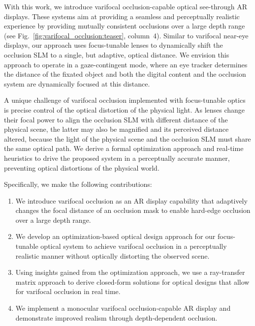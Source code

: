 With this work, we introduce varifocal occlusion-capable optical see-through AR displays. These systems aim at providing a seamless and perceptually realistic experience by providing mutually consistent occlusions over a large depth range (see Fig.~\ref{fig:varifocal_occlusion:teaser}, column~4). Similar to varifocal near-eye displays, our approach uses focus-tunable lenses to dynamically shift the occlusion SLM to a single, but adaptive, optical distance. We envision this approach to operate in a gaze-contingent mode, where an eye tracker determines the distance of the fixated object and both the digital content and the occlusion system are dynamically focused at this distance. 

A unique challenge of varifocal occlusion implemented with focus-tunable optics is precise control of the optical distortion of the physical light. As lenses change their focal power to align the occlusion SLM with different distance of the physical scene, the latter may also be magnified and its perceived distance altered, because the light of the physical scene and the occlusion SLM must share the same optical path. We derive a formal optimization approach and real-time heuristics to drive the proposed system in a perceptually accurate manner, preventing optical distortions of the physical world. 

Specifically, we make the following contributions:
%
\begin{enumerate}
\item We introduce varifocal occlusion as an AR display capability that adaptively changes the focal distance of an occlusion mask to enable hard-edge occlusion over a large depth range. 
\item  We develop an optimization-based optical design approach for our focus-tunable optical system to achieve varifocal occlusion in a perceptually realistic manner without optically distorting the observed scene. 
\item Using insights gained from the optimization approach, we use a ray-transfer matrix approach to derive closed-form solutions for optical designs that allow for varifocal occlusion in real time.
\item We implement a monocular varifocal occlusion-capable AR display and demonstrate improved realism through depth-dependent occlusion.
\end{enumerate}


